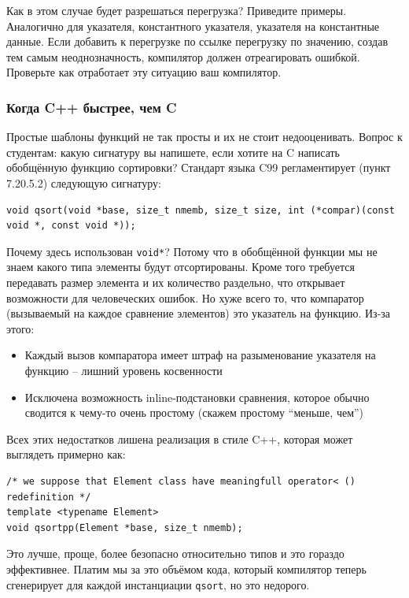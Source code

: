 \documentclass[a4paper,12pt,oneside]{article}
\begin{document}
Как в этом случае будет разрешаться перегрузка? Приведите примеры. Аналогично для указателя, константного указателя, указателя на константные данные. Если добавить к перегрузке по ссылке перегрузку по значению, создав тем самым неоднозначность, компилятор должен отреагировать ошибкой. Проверьте как отработает эту ситуацию ваш компилятор.

\subsubsection{Когда C++ быстрее, чем C}\label{CppBetterC}

Простые шаблоны функций не так просты и их не стоит недооценивать. Вопрос к студентам: какую сигнатуру вы напишете, если хотите на C написать обобщённую функцию сортировки? Стандарт языка C99 регламентирует (пункт 7.20.5.2) следующую сигнатуру:

\begin{lstlisting}
void qsort(void *base, size_t nmemb, size_t size, int (*compar)(const void *, const void *));
\end{lstlisting}

Почему здесь использован \lstinline!void*!? Потому что в обобщённой функции мы не знаем какого типа элементы будут отсортированы. Кроме того требуется передавать размер элемента и их количество раздельно, что открывает возможности для человеческих ошибок. Но хуже всего то, что компаратор (вызываемый на каждое сравнение элементов) это указатель на функцию. Из-за этого:

\begin{itemize}
\item Каждый вызов компаратора имеет штраф на разыменование указателя на функцию -- лишний уровень косвенности
\item Исключена возможность inline-подстановки сравнения, которое обычно сводится к чему-то очень простому (скажем простому ``меньше, чем'')
\end{itemize}

Всех этих недостатков лишена реализация в стиле C++, которая может выглядеть примерно как:

\begin{lstlisting}
/* we suppose that Element class have meaningfull operator< () redefinition */
template <typename Element>
void qsortpp(Element *base, size_t nmemb);
\end{lstlisting}

Это лучше, проще, более безопасно относительно типов и это гораздо эффективнее. Платим мы за это объёмом кода, который компилятор теперь сгенерирует для каждой инстанциации \lstinline!qsort!, но это недорого.
\end{document}
